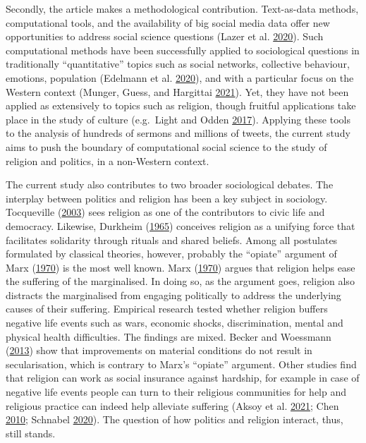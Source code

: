 \documentclass[
  12pt,
]{article}
\begin{document}
Secondly, the article makes a methodological contribution. Text-as-data methods, computational tools, and the availability of big social media data offer new opportunities to address social science questions (Lazer et al. \protect\hyperlink{ref-Lazer1060}{2020}). Such computational methods have been successfully applied to sociological questions in traditionally ``quantitative'' topics such as social networks, collective behaviour, emotions, population (Edelmann et al. \protect\hyperlink{ref-compsocsciARS20}{2020}), and with a particular focus on the Western context (Munger, Guess, and Hargittai \protect\hyperlink{ref-Munger_Guess_Hargittai_2021}{2021}). Yet, they have not been applied as extensively to topics such as religion, though fruitful applications take place in the study of culture (e.g.~Light and Odden \protect\hyperlink{ref-light2017managing}{2017}). Applying these tools to the analysis of hundreds of sermons and millions of tweets, the current study aims to push the boundary of computational social science to the study of religion and politics, in a non-Western context.

The current study also contributes to two broader sociological debates. The interplay between politics and religion has been a key subject in sociology. Tocqueville (\protect\hyperlink{ref-tocqueville2003democracy}{2003}) sees religion as one of the contributors to civic life and democracy. Likewise, Durkheim (\protect\hyperlink{ref-durkheim1965elementary}{1965}) conceives religion as a unifying force that facilitates solidarity through rituals and shared beliefs. Among all postulates formulated by classical theories, however, probably the ``opiate'' argument of Marx (\protect\hyperlink{ref-marx1970marx}{1970}) is the most well known. Marx (\protect\hyperlink{ref-marx1970marx}{1970}) argues that religion helps ease the suffering of the marginalised. In doing so, as the argument goes, religion also distracts the marginalised from engaging politically to address the underlying causes of their suffering. Empirical research tested whether religion buffers negative life events such as wars, economic shocks, discrimination, mental and physical health difficulties. The findings are mixed. Becker and Woessmann (\protect\hyperlink{ref-becker2013not}{2013}) show that improvements on material conditions do not result in secularisation, which is contrary to Marx's ``opiate'' argument. Other studies find that religion can work as social insurance against hardship, for example in case of negative life events people can turn to their religious communities for help and religious practice can indeed help alleviate suffering (Aksoy et al. \protect\hyperlink{ref-aksoy2020religiosity}{2021}; Chen \protect\hyperlink{ref-chen2010club}{2010}; Schnabel \protect\hyperlink{ref-Sch21}{2020}). The question of how politics and religion interact, thus, still stands.
\end{document}
